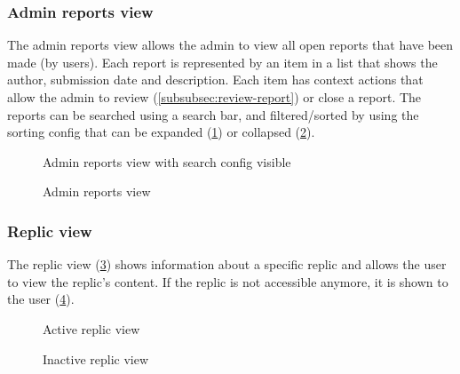 \subsubsection{Admin reports view}
The admin reports view allows the admin to view all open reports that have been made (by users).
Each report is represented by an item in a list that shows the author, submission date and description.
Each item has context actions that allow the admin to review (\ref{subsubsec:review-report}) or close a report.
The reports can be searched using a search bar, and filtered/sorted by using the sorting config that can be expanded (\ref{fig:web-reports-config-view}) or collapsed (\ref{fig:web-reports-noconfig-view}).
\begin{figure}
    \centering

    \caption{Admin reports view with search config visible}
    \label{fig:web-reports-config-view}
\end{figure}
\begin{figure}
    \centering

    \caption{Admin reports view}
    \label{fig:web-reports-noconfig-view}
\end{figure}

\subsubsection{Replic view}
The replic view (\ref{fig:web-replic-active-view}) shows information about a specific replic and allows the user to view the replic's content.
If the replic is not accessible anymore, it is shown to the user (\ref{fig:web-replic-inactive-view}).
\begin{figure}
    \centering

    \caption{Active replic view}
    \label{fig:web-replic-active-view}
\end{figure}
\begin{figure}
    \centering

    \caption{Inactive replic view}
    \label{fig:web-replic-inactive-view}
\end{figure}